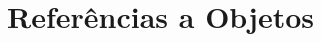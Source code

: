 \documentclass[xcolor={dvipsnames,table},aspectratio=169]{beamer}
\begin{document}

\section{Referências a Objetos}
\end{document}
